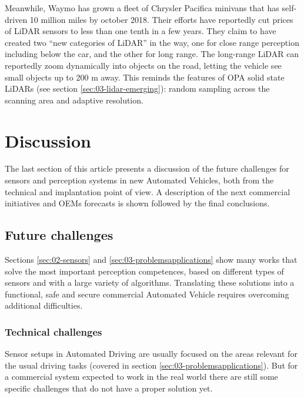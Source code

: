 \documentclass[journal]{IEEEtran}
\begin{document}
Meanwhile, Waymo has grown a fleet of Chrysler Pacifica minivans that has
self-driven 10 million miles by october 2018. Their efforts have reportedly 
cut prices of LiDAR sensors to less than one tenth in a few years. 
They claim to have created two ``new categories of LiDAR'' \cite{Waymoteam2017} 
in the way, one for close range perception including below the car, and the
other for long range. The long-range LiDAR can reportedly zoom dynamically into 
objects on the road, letting the vehicle see small objects up to 200 m away. 
This reminds the features of OPA solid state LiDARs (see section
\ref{sec:03-lidar-emerging}): random sampling across the 
scanning area and adaptive resolution.


\section{Discussion}
\label{sec:06-discussion}

The last section of this article presents a discussion of the future challenges 
for sensors and perception systems in new Automated Vehicles, both from the 
technical and implantation point of view. A description of the next 
commercial initiatives and OEMs forecasts is shown followed by the final 
conclusions.

\subsection{Future challenges}

Sections \ref{sec:02-sensors} and \ref{sec:03-problemsapplications} show many 
works that solve the most important perception competences, based on different 
types of sensors and with a large variety of algorithms. 
Translating these solutions into a functional, safe and secure commercial 
Automated Vehicle requires overcoming additional difficulties.

\subsubsection{Technical challenges}

Sensor setups in Automated Driving are usually focused on the areas relevant 
for the usual driving tasks (covered in section 
\ref{sec:03-problemsapplications}). 
But for a commercial system expected to work in the real world there are still
some specific challenges that do not have a proper solution yet.
\end{document}
